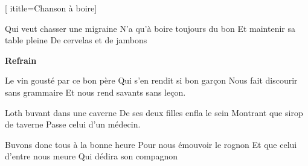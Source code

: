 [
	ititle={Chanson à boire}]


\beginverse
Qui veut chasser une migraine
N'a qu'à boire toujours du bon
Et maintenir sa table pleine
De cervelas et de jambons
\endverse

\beginchorus
\textbf{Refrain}
\endchorus

\beginverse
Le vin gousté par ce bon père
Qui s'en rendit si bon garçon
Nous fait discourir sans grammaire
Et nous rend savants sans leçon.
\endverse

\beginverse
Loth buvant dans une caverne
De ses deux filles enfla le sein
Montrant que sirop de taverne
Passe celui d'un médecin.
\endverse

\beginverse
Buvons donc tous à la bonne heure
Pour nous émouvoir le rognon
Et que celui d'entre nous meure
Qui dédira son compagnon
\endverse

\endsong
